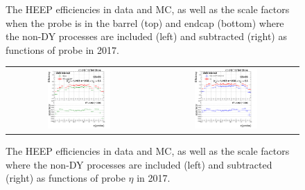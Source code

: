 \begin{figure}[htp]
\begin{center}
\begin{tabular}{cc}
    \end{tabular}
    \caption{The HEEP efficiencies in data and MC, as well as the scale factors when the probe is in the barrel (top) and endcap (bottom) where the non-DY processes are included (left) and subtracted (right) as functions of probe \et in 2017.}
    \label{fig:eff_SS_nominal_ET_2017}
  \end{center}
\end{figure}

\begin{figure}[htp]
  \begin{center}
    \begin{tabular}{cc}
      \includegraphics[width=0.45\textwidth]{figures/Zprime/2017/ScaleFactor/SameSign/nominal/g_compare_cut_eta_Barrel+Endcap_ea_ta_inc_AS_nominal_PUW.png} &
      \includegraphics[width=0.45\textwidth]{figures/Zprime/2017/ScaleFactor/SameSign/nominal/g_compare_cut_eta_Barrel+Endcap_ea_ta_exc_AS_nominal_PUW.png} \\
    \end{tabular}
    \caption{The HEEP efficiencies in data and MC, as well as the scale factors where the non-DY processes are included (left) and subtracted (right) as functions of probe $\eta$ in 2017.}
    \label{fig:eff_SS_nominal_eta_2017}
  \end{center}
\end{figure}

